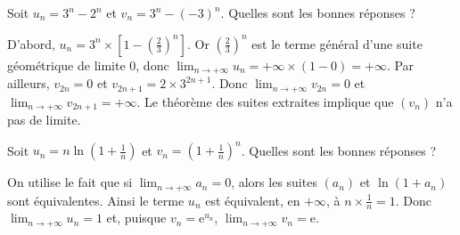 \begin{question}
Soit $\displaystyle u_n=3^n-2^n$ et $\displaystyle v_n=3^n-(-3)^n$. Quelles sont les bonnes réponses ?
\begin{answers}  
\end{answers}
\begin{explanations}
D'abord, $\displaystyle u_n=3^n\times \left[1-\left(\frac{2}{3}\right)^n\right]$. Or $\displaystyle \left(\frac{2}{3}\right)^n$ est le terme général d'une suite géométrique de limite $0$, donc $\displaystyle \lim _{n\to +\infty}u_n=+\infty\times (1-0)=+\infty$. Par ailleurs, $\displaystyle v_{2n}=0$ et $v_{2n+1}=2\times 3^{2n+1}$. Donc $\displaystyle \lim _{n\to +\infty}v_{2n}=0$ et $\displaystyle \lim _{n\to +\infty}v_{2n+1}=+\infty$. Le théorème des suites extraites implique que $(v_n)$ n'a pas de limite.
\end{explanations}
\end{question}



\begin{question}
Soit $\displaystyle u_n=n\ln\left(1+\frac{1}{n}\right)$ et $\displaystyle v_n=\left(1+\frac{1}{n}\right)   ^n$. Quelles sont les bonnes réponses ?
\begin{answers}  
\end{answers}
\begin{explanations}
On utilise le fait que si $\displaystyle \lim _{n\to +\infty}a_n=0$, alors les suites $(a_n)$ et $\ln (1+a_n)$ sont équivalentes. Ainsi le terme $u_n$ est équivalent, en $+\infty$, à $\displaystyle n\times \frac{1}{n}=1$. Donc $\displaystyle \lim _{n\to +\infty}u_n=1$ et, puisque $v_n=\mathrm{e}^{u_n}$, $\displaystyle \lim _{n\to +\infty}v_n=\mathrm{e}$.
\end{explanations}
\end{question}



